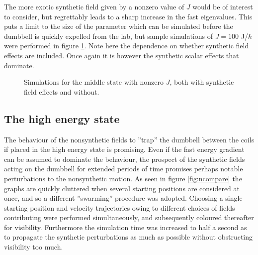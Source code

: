 \documentclass[main.tex]{subfiles}
\begin{document}
The more exotic synthetic field given by a nonzero value of \(J\) would be of interest to
consider, but regrettably leads to a sharp increase in the fast eigenvalues. This puts a
limit to the size of the parameter which can be simulated before the dumbbell is quickly
expelled from the lab, but sample simulations of \(J = 100\) J/\(\hbar{}\) were performed
in figure \ref{fig:n1Je2}. Note here the dependence on whether synthetic field effects are
included. Once again it is however the synthetic scalar effects that dominate.
\begin{figure}[h]
    \centering
    \qquad
    \caption{\centering Simulations for the middle state with nonzero \(J\), both with synthetic field
    effects and without.}%
    \label{fig:n1Je2}
\end{figure}


\subsection{The high energy state}
The behaviour of the nonsynthetic fields to ''trap'' the dumbbell between the coils if
placed in the high energy state is promising. Even if the fast energy gradient can be
assumed to dominate the behaviour, the prospect of the synthetic fields acting on the
dumbbell for extended periods of time promises perhaps notable perturbations to the
nonsynthetic motion. As seen in figure \ref{fig:ncompare} the graphs are quickly cluttered
when several starting positions are considered at once, and so a different ''swarming''
procedure was adopted. Choosing a single starting position and velocity trajectories owing
to different choices of fields contributing were performed simultaneously, and subsequently
coloured thereafter for visibility. Furthermore the simulation time was increased to half a
second as to propagate the synthetic perturbations as much as possible without obstructing
visibility too much.
\end{document}
